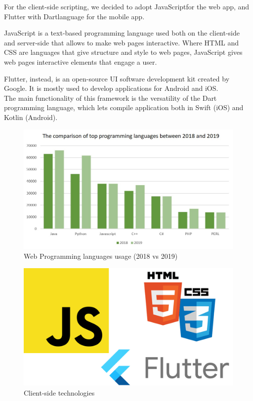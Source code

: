 \documentclass[table, 12pt]{article}
\begin{document}
For the client-side scripting, we decided to adopt JavaScript\texttrademark  for the web app, and Flutter with Dart\texttrademark  language for the mobile app.

JavaScript is a text-based programming language used both on the client-side and server-side that allows to make web pages interactive. Where HTML and CSS are languages that give structure and style to web pages, JavaScript gives web pages interactive elements that engage a user.

Flutter, instead, is an open-source UI software development kit created by Google. It is mostly used to develop applications for Android and iOS.\\
The main functionality of this framework is the versatility of the Dart programming language, which lets compile application both in Swift (iOS) and Kotlin (Android).  

\begin{figure}[H]
    \includegraphics[width=\textwidth]{assets/graph-18-19-languages.jpg}
    \caption{Web Programming languages usage (2018 vs 2019)}
    \label{languages_comparison}
\end{figure}

\begin{figure}[H]
    \includegraphics[width=\textwidth]{assets/client-side-scripting.png}
    \caption{Client-side technologies}
\end{figure}
\end{document}

